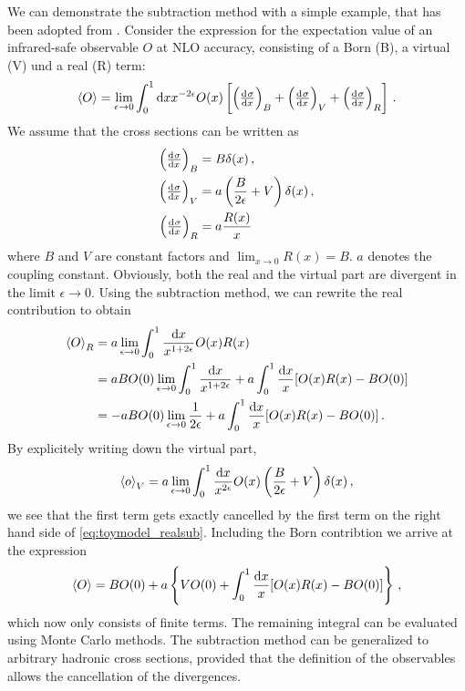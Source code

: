 We can demonstrate the subtraction method with a simple example, that has been adopted from \cite{mcatnlo}.
Consider the expression for the expectation value of an infrared-safe observable $O$ at NLO accuracy, consisting of a Born (B), a virtual (V) und a real (R) term:
%
\begin{equation}
	\left< O \right> = \lim_{\epsilon \rightarrow 0} \int_0^1 \dif x x^{-2 \epsilon} O(x) \left[ \left( \od{\sigma}{x} \right)_B + \left( \od{\sigma}{x} \right)_V + \left( \od{\sigma}{x} \right)_R \right] \, .
\end{equation}
%
We assume that the cross sections can be written as
%
\begin{align}
	\left( \od{\sigma}{x} \right)_B &= B \delta(x) \, , \\
	\left( \od{\sigma}{x} \right)_V &= a \left( \frac{B}{2 \epsilon} + V \right) \delta(x) \, , \\
	\left( \od{\sigma}{x} \right)_R &= a \frac{R(x)}{x} \,
\end{align}
%
where $B$ and $V$ are constant factors and $\lim_{x \rightarrow 0} R(x) = B$.
$a$ denotes the coupling constant.
Obviously, both the real and the virtual part are divergent in the limit $\epsilon \rightarrow 0$.
Using the subtraction method, we can rewrite the real contribution to obtain
%
\begin{align}
	\left< O \right>_R	&= a \lim_{\epsilon \rightarrow 0} \int_0^1 \frac{\dif x}{x^{1+2 \epsilon}} O(x) R(x) \nonumber \\
						&= a B O(0) \lim_{\epsilon \rightarrow 0} \int_0^1 \frac{\dif x}{x^{1+2 \epsilon}} + a \int_0^1 \frac{\dif x}{x} [O(x) R(x) - B O(0)] \nonumber \\
						&= -a B O(0) \lim_{\epsilon \rightarrow 0} \frac{1}{2 \epsilon} + a \int_0^1 \frac{\dif x}{x} [O(x) R(x) - B O(0)] \, .
	\label{eq:toymodel_realsub}
\end{align}
%
By explicitely writing down the virtual part,
%
\begin{equation}
	\left< o \right>_V = a \lim_{\epsilon \rightarrow 0} \int_0^1 \frac{\dif x}{x^{2 \epsilon}} O(x) \left( \frac{B}{2 \epsilon} + V \right) \delta(x) \, ,
\end{equation}
%
we see that the first term gets exactly cancelled by the first term on the right hand side of \eqref{eq:toymodel_realsub}.
Including the Born contribtion we arrive at the expression
%
\begin{equation}
	\left< O \right> = B O(0) + a \left\{ V O(0) + \int_0^1 \frac{\dif x}{x} [O(x) R(x) - B O(0)] \right\} \, ,
\end{equation}
%
which now only consists of finite terms.
The remaining integral can be evaluated using Monte Carlo methods.
The subtraction method can be generalized to arbitrary hadronic cross sections, provided that the definition of the observables allows the cancellation of the divergences.
%
